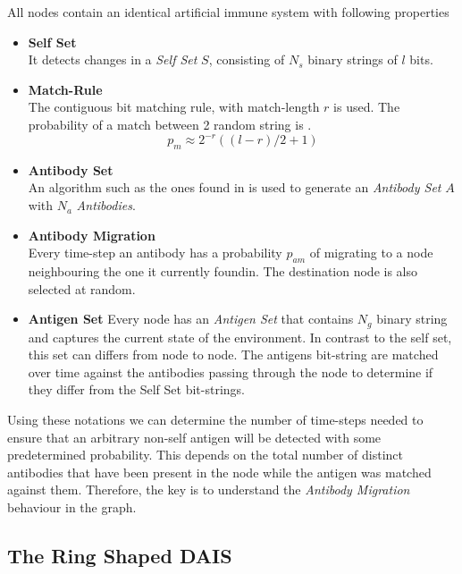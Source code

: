 \documentclass{article}
\begin{document}
All nodes contain an identical artificial immune system with following properties
\begin{itemize}
   \item{\bf Self Set\\}
     It detects changes in a {\it Self Set} $S$, consisting of $N_s$ binary strings of $l$ bits.
   \item{\bf Match-Rule\\}
     The contiguous bit matching rule, with match-length $r$ is used.
     The probability of a match between 2 random string is \cite{forrest_first}.
     \begin{equation}
       p_m \approx 2^{-r}((l-r)/2 + 1)
     \end{equation}
   \item{\bf Antibody Set\\}
     An algorithm such as the ones found in \cite{dhaeseleer_further} is used to generate an {\it Antibody Set} $A$ with $N_a$ {\it Antibodies}.
   \item{\bf Antibody Migration\\}
     Every time-step an antibody has a probability $p_{am}$ of migrating to a node neighbouring the one it currently foundin.
     The destination node is also selected at random.
   \item{\bf Antigen Set}
     Every node has an {\it Antigen Set} that contains $N_g$ binary string and captures the current state of the environment.
     In contrast to the self set, this set can differs from node to node.
     The antigens bit-string are matched over time against the antibodies passing through the node to determine if they differ from the Self Set bit-strings.
\end{itemize}

Using these notations we can determine the number of time-steps needed to ensure that an arbitrary non-self antigen will be detected with some predetermined probability.
This depends on the total number of distinct antibodies that have been present in the node while the antigen was matched against them.
Therefore, the key is to understand the {\it Antibody Migration} behaviour in the graph. 

\subsection{The Ring Shaped DAIS}
\label{sec_dais_ring}
\end{document}
